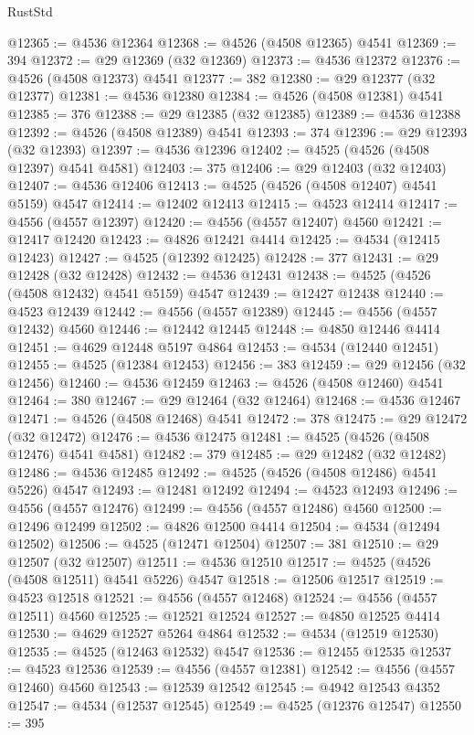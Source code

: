 \begin{lexlean}{RustStd}
\begin{coremodule}
@12365 := @4536 @12364
@12368 := @4526 (@4508 @12365) @4541
@12369 := 394
@12372 := @29 @12369 (@32 @12369)
@12373 := @4536 @12372
@12376 := @4526 (@4508 @12373) @4541
@12377 := 382
@12380 := @29 @12377 (@32 @12377)
@12381 := @4536 @12380
@12384 := @4526 (@4508 @12381) @4541
@12385 := 376
@12388 := @29 @12385 (@32 @12385)
@12389 := @4536 @12388
@12392 := @4526 (@4508 @12389) @4541
@12393 := 374
@12396 := @29 @12393 (@32 @12393)
@12397 := @4536 @12396
@12402 := @4525 (@4526 (@4508 @12397) @4541 @4581)
@12403 := 375
@12406 := @29 @12403 (@32 @12403)
@12407 := @4536 @12406
@12413 := @4525 (@4526 (@4508 @12407) @4541 @5159) @4547
@12414 := @12402 @12413
@12415 := @4523 @12414
@12417 := @4556 (@4557 @12397)
@12420 := @4556 (@4557 @12407) @4560
@12421 := @12417 @12420
@12423 := @4826 @12421 @4414
@12425 := @4534 (@12415 @12423)
@12427 := @4525 (@12392 @12425)
@12428 := 377
@12431 := @29 @12428 (@32 @12428)
@12432 := @4536 @12431
@12438 := @4525 (@4526 (@4508 @12432) @4541 @5159) @4547
@12439 := @12427 @12438
@12440 := @4523 @12439
@12442 := @4556 (@4557 @12389)
@12445 := @4556 (@4557 @12432) @4560
@12446 := @12442 @12445
@12448 := @4850 @12446 @4414
@12451 := @4629 @12448 @5197 @4864
@12453 := @4534 (@12440 @12451)
@12455 := @4525 (@12384 @12453)
@12456 := 383
@12459 := @29 @12456 (@32 @12456)
@12460 := @4536 @12459
@12463 := @4526 (@4508 @12460) @4541
@12464 := 380
@12467 := @29 @12464 (@32 @12464)
@12468 := @4536 @12467
@12471 := @4526 (@4508 @12468) @4541
@12472 := 378
@12475 := @29 @12472 (@32 @12472)
@12476 := @4536 @12475
@12481 := @4525 (@4526 (@4508 @12476) @4541 @4581)
@12482 := 379
@12485 := @29 @12482 (@32 @12482)
@12486 := @4536 @12485
@12492 := @4525 (@4526 (@4508 @12486) @4541 @5226) @4547
@12493 := @12481 @12492
@12494 := @4523 @12493
@12496 := @4556 (@4557 @12476)
@12499 := @4556 (@4557 @12486) @4560
@12500 := @12496 @12499
@12502 := @4826 @12500 @4414
@12504 := @4534 (@12494 @12502)
@12506 := @4525 (@12471 @12504)
@12507 := 381
@12510 := @29 @12507 (@32 @12507)
@12511 := @4536 @12510
@12517 := @4525 (@4526 (@4508 @12511) @4541 @5226) @4547
@12518 := @12506 @12517
@12519 := @4523 @12518
@12521 := @4556 (@4557 @12468)
@12524 := @4556 (@4557 @12511) @4560
@12525 := @12521 @12524
@12527 := @4850 @12525 @4414
@12530 := @4629 @12527 @5264 @4864
@12532 := @4534 (@12519 @12530)
@12535 := @4525 (@12463 @12532) @4547
@12536 := @12455 @12535
@12537 := @4523 @12536
@12539 := @4556 (@4557 @12381)
@12542 := @4556 (@4557 @12460) @4560
@12543 := @12539 @12542
@12545 := @4942 @12543 @4352
@12547 := @4534 (@12537 @12545)
@12549 := @4525 (@12376 @12547)
@12550 := 395

\end{coremodule}
\end{lexlean}
